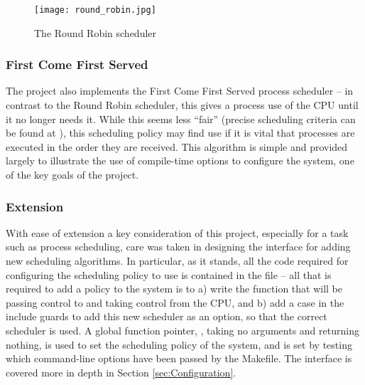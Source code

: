        \begin{figure}
            \centering
            \texttt{[image: round\_robin.jpg]}
            \caption{The Round Robin scheduler}
            \label{fig:RoundRobin}
        \end{figure}

    \subsubsection{First Come First Served}
        The project also implements the First Come First Served process
        scheduler -- in contrast to the Round Robin scheduler, this gives a
        process use of the CPU until it no longer needs it. While this seems
        less ``fair'' (precise scheduling criteria can be found at
        \cite[pg.~265]{DinosaurOS}), this scheduling policy may find use if it
        is vital that processes are executed in the order they are received.
        This algorithm is simple and provided largely to illustrate the use of
        compile-time options to configure the system, one of the key goals of
        the project.

    \subsubsection{Extension}
        With ease of extension a key consideration of this project, especially
        for a task such as process scheduling, care was taken in designing the
        interface for adding new scheduling algorithms. In particular, as it
        stands, all the code required for configuring the scheduling policy to
        use is contained in the file  -- all that is required to
        add a policy to the system is to a) write the function that will be
        passing control to and taking control from the CPU, and b) add a case in
        the include guards to add this new scheduler as an option, so that the
        correct scheduler is used. A global function pointer, , taking no arguments and returning nothing, is used
        to set the scheduling policy of the system, and is set by testing which
        command-line options have been passed by the Makefile. The interface is
        covered more in depth in Section \ref{sec:Configuration}.

